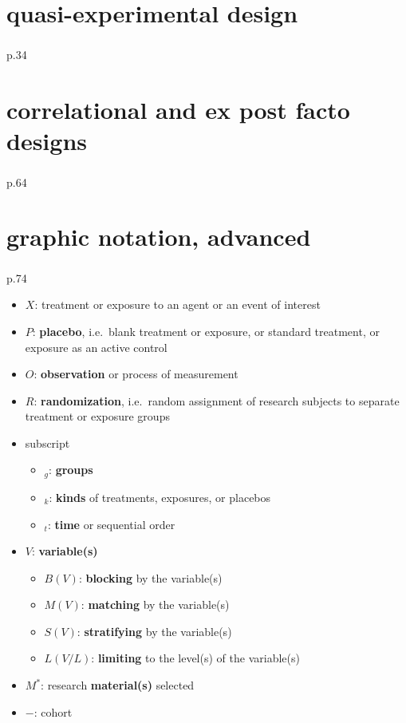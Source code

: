 \documentclass[
]{book}
\providecommand{\tightlist}{%
  \setlength{\itemsep}{0pt}\setlength{\parskip}{0pt}}
\theoremstyle{definition}
\theoremstyle{definition}
\theoremstyle{definition}
\theoremstyle{definition}
\theoremstyle{remark}
\begin{document}
\section{quasi-experimental design}\label{quasi-experimental-design}

\textsuperscript{} p.34

\section{correlational and ex post facto designs}\label{correlational-and-ex-post-facto-designs}

\textsuperscript{} p.64

\section{graphic notation, advanced}\label{graphic-notation-advanced}

\textsuperscript{} p.74

\begin{itemize}
\tightlist
\item
  \(X\): treatment or exposure to an agent or an event of interest
\item
  \(P\): \textbf{placebo}, i.e.~blank treatment or exposure, or standard treatment, or exposure as an active control
\item
  \(O\): \textbf{observation} or process of measurement
\item
  \(R\): \textbf{randomization}, i.e.~random assignment of research subjects to separate treatment or exposure groups
\item
  subscript

  \begin{itemize}
  \tightlist
  \item
    \(_g\): \textbf{groups}
  \item
    \(_k\): \textbf{kinds} of treatments, exposures, or placebos
  \item
    \(_t\): \textbf{time} or sequential order
  \end{itemize}
\item
  \(V\): \textbf{variable(s)}

  \begin{itemize}
  \tightlist
  \item
    \(B(V)\): \textbf{blocking} by the variable(s)
  \item
    \(M(V)\): \textbf{matching} by the variable(s)
  \item
    \(S(V)\): \textbf{stratifying} by the variable(s)
  \item
    \(L(V/L)\): \textbf{limiting} to the level(s) of the variable(s)
  \end{itemize}
\item
  \(M^{*}\): research \textbf{material(s)} selected
\item
  \(-\): cohort
\end{itemize}
\end{document}
